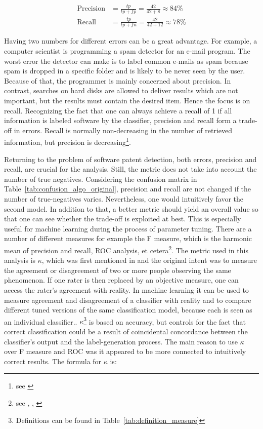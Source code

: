 \documentclass[12pt, a4paper]{scrartcl}
\theoremstyle{definition}
\begin{document}
\begin{align*}
\text{Precision} &= \frac{tp}{tp + fp} = \frac{42}{42 + 8} \approx 84\% \\
\text{Recall} &= \frac{tp}{tp + fn} = \frac{42}{42 + 12} \approx 78\%
\end{align*}

Having two numbers for different errors can be a great advantage. For example,
a computer scientist is programming a spam detector for an e-mail program. The
worst error the detector can make is to label common e-mails as spam because
spam is dropped in a specific folder and is likely to be never seen by the
user. Because of that, the programmer is mainly concerned about precision. In
contrast, searches on hard disks are allowed to deliver results which are not
important, but the results must contain the desired item. Hence the focus is on
recall. Recognizing the fact that one can always achieve a recall of 1 if all
information is labeled software by the classifier, precision and recall form a
trade-off in errors. Recall is normally non-decreasing in the number of
retrieved information, but precision is decreasing\footnote{see
\citet[p.~156]{manning2008introduction}}.

Returning to the problem of software patent detection, both errors, precision
and recall, are crucial for the analysis. Still, the metric does not take into
account the number of true negatives. Considering the confusion matrix in
Table~\ref{tab:confusion_algo_original}, precision and recall are not changed
if the number of true-negatives varies. Nevertheless, one would intuitively
favor the second model. In addition to that, a better metric should yield an
overall value so that one can see whether the trade-off is exploited at best.
This is especially useful for machine learning during the process of parameter
tuning. There are a number of different measures for example the F measure,
which is the harmonic mean of precision and recall, ROC analysis, et
cetera\footnote{see \cite{manning2008introduction},
\cite{powers2011evaluation}, \cite{fawcett2006introduction}}. The metric used
in this analysis is $\kappa$, which was first mentioned in
\cite{cohen1960coefficient} and the original intent was to measure the
agreement or disagreement of two or more people observing the same phenomenon.
If one rater is then replaced by an objective measure, one can access the
rater's agreement with reality. In machine learning it can be used to measure
agreement and disagreement of a classifier with reality and to compare
different tuned versions of the same classification model, because each is seen
as an individual classifier.. $\kappa$\footnote{Definitions can be found in
Table~\ref{tab:definition_measure}} is based on accuracy, but controls for the
fact that correct classification could be a result of coincidental concordance
between the classifier's output and the label-generation process. The main
reason to use $\kappa$ over F measure and ROC was it appeared to be more
connected to intuitively correct results. The formula for $\kappa$ is:
\end{document}
